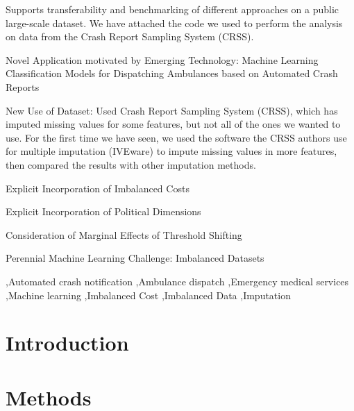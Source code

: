 \documentclass[fleqn]{cas-sc}
\begin{document}
\begin{highlights}
	\item  Supports transferability and benchmarking of different approaches on a public large-scale dataset.  We have attached the code we used to perform the analysis on data from the Crash Report Sampling System (CRSS).  
	\item Novel Application motivated by Emerging Technology:  Machine Learning Classification Models for Dispatching Ambulances based on Automated Crash Reports
	\item New Use of Dataset:  Used Crash Report Sampling System (CRSS), which has imputed missing values for some features, but not all of the ones we wanted to use.  For the first time we have seen, we used the software the CRSS authors use for multiple imputation (IVEware) to impute missing values in more features, then compared the results with other imputation methods.
	\item Explicit Incorporation of Imbalanced Costs
	\item Explicit Incorporation of Political Dimensions
	\item Consideration of Marginal Effects of Threshold Shifting
	\item Perennial Machine Learning Challenge:  Imbalanced Datasets
\end{highlights}

\begin{keywords}
 \sep Automated crash notification 
 \sep Ambulance dispatch 
 \sep Emergency medical services  
 \sep Machine learning 
 \sep Imbalanced Cost 
 \sep Imbalanced Data 
 \sep Imputation
\end{keywords}

\maketitle


%
%
%


\section{Introduction}\label{sec:Introduction}
%

\section{Methods}\label{sec:Methods}

%
%
\end{document}

